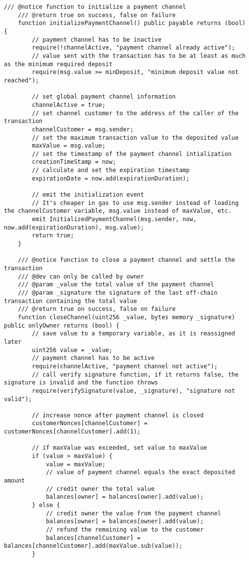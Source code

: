 \begin{lstlisting}[language=Solidity, caption={Payment Channel Smart Contract}, label={lis:pc_sc}]
    /// @notice function to initialize a payment channel
    /// @return true on success, false on failure
    function initializePaymentChannel() public payable returns (bool) {
        // payment channel has to be inactive
        require(!channelActive, "payment channel already active");
        // value sent with the transaction has to be at least as much as the minimum required deposit
        require(msg.value >= minDeposit, "minimum deposit value not reached");

        // set global payment channel information
        channelActive = true;
        // set channel customer to the address of the caller of the transaction
        channelCustomer = msg.sender;
        // set the maximum transaction value to the deposited value
        maxValue = msg.value;
        // set the timestamp of the payment channel intialization
        creationTimeStamp = now;
        // calculate and set the expiration timestamp
        expirationDate = now.add(expirationDuration);

        // emit the initialization event
        // It's cheaper in gas to use msg.sender instead of loading the channelCustomer variable, msg.value instead of maxValue, etc.
        emit InitializedPaymentChannel(msg.sender, now, now.add(expirationDuration), msg.value);
        return true;
    }

    /// @notice function to close a payment channel and settle the transaction
    /// @dev can only be called by owner
    /// @param _value the total value of the payment channel
    /// @param _signature the signature of the last off-chain transaction containing the total value
    /// @return true on success, false on failure
    function closeChannel(uint256 _value, bytes memory _signature) public onlyOwner returns (bool) {
        // save value to a temporary variable, as it is reassigned later
        uint256 value = _value;
        // payment channel has to be active
        require(channelActive, "payment channel not active");
        // call verify signature function, if it returns false, the signature is invalid and the function throws
        require(verifySignature(value, _signature), "signature not valid");

        // increase nonce after payment channel is closed
        customerNonces[channelCustomer] = customerNonces[channelCustomer].add(1);

        // if maxValue was exceeded, set value to maxValue
        if (value > maxValue) {
            value = maxValue;
            // value of payment channel equals the exact deposited amount
            // credit owner the total value
            balances[owner] = balances[owner].add(value);
        } else {
            // credit owner the value from the payment channel
            balances[owner] = balances[owner].add(value);
            // refund the remaining value to the customer
            balances[channelCustomer] = balances[channelCustomer].add(maxValue.sub(value));
        }


\end{lstlisting}

